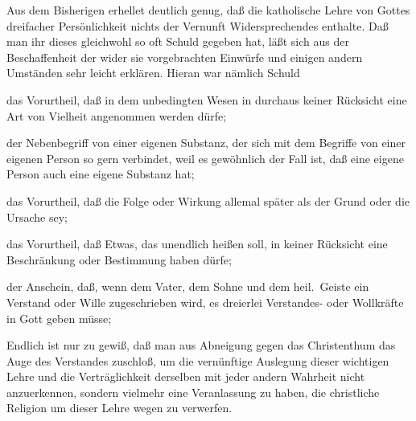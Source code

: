 Aus dem Bisherigen erhellet deutlich genug, daß die katholische Lehre von Gottes dreifacher Persönlichkeit nichts der Vernunft Widersprechendes enthalte. Daß man ihr dieses gleichwohl so oft Schuld gegeben hat, läßt sich aus der Beschaffenheit der wider sie vorgebrachten Einwürfe und einigen andern Umständen sehr leicht erklären. Hieran war nämlich Schuld
\begin{aufzb}
\item das Vorurtheil, daß in dem unbedingten Wesen in durchaus keiner Rücksicht eine Art von Vielheit angenommen werden dürfe;
\item der Nebenbegriff von einer eigenen Substanz, der sich mit dem Begriffe von einer eigenen Person so gern verbindet, weil es gewöhnlich der Fall ist, daß eine eigene Person auch eine eigene Substanz hat;
\item das Vorurtheil, daß die Folge oder Wirkung allemal später als der Grund oder die Ursache sey;
\item das Vorurtheil, daß Etwas, das unendlich heißen soll, in keiner Rücksicht eine Beschränkung oder Bestimmung haben dürfe;
\item der Anschein, daß, wenn dem Vater, dem Sohne und dem heil.\ Geiste ein Verstand oder Wille zugeschrieben wird, es dreierlei Verstandes- oder  Wollkräfte in Gott geben müsse;
\item Endlich ist nur zu gewiß, daß man aus Abneigung gegen das Christenthum das Auge des Verstandes zuschloß, um die vernünftige Auslegung dieser wichtigen Lehre und die Verträglichkeit derselben mit jeder andern Wahrheit nicht anzuerkennen, sondern vielmehr eine Veranlassung zu haben, die christliche Religion um dieser Lehre wegen zu verwerfen.
\end{aufzb}

